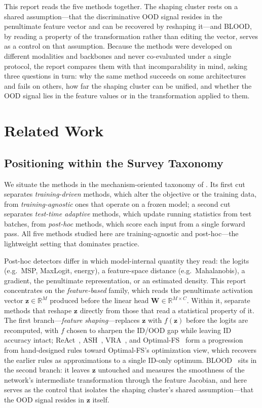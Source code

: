 \documentclass[a4paper]{article}
\begin{document}
This report reads the five methods together. The shaping cluster rests on a shared
assumption---that the discriminative OOD signal resides in the penultimate feature
vector and can be recovered by reshaping it---and BLOOD, by reading a property of the
transformation rather than editing the vector, serves as a control on that assumption.
Because the methods were developed on different modalities and backbones and never
co-evaluated under a single protocol, the report compares them with that
incomparability in mind, asking three questions in turn: why the same method succeeds
on some architectures and fails on others, how far the shaping cluster can be unified,
and whether the OOD signal lies in the feature values or in the transformation applied
to them.

\section{Related Work}
\label{related}


\subsection{Positioning within the Survey Taxonomy}
\label{subsec:taxonomy}

We situate the methods in the mechanism-oriented taxonomy of \citet{survey}. Its
first cut separates \emph{training-driven} methods, which alter the objective or the
training data, from \emph{training-agnostic} ones that operate on a frozen model; a
second cut separates \emph{test-time adaptive} methods, which update running
statistics from test batches, from \emph{post-hoc} methods, which score each input
from a single forward pass. All five methods studied here are training-agnostic and
post-hoc---the lightweight setting that dominates practice.

Post-hoc detectors differ in which model-internal quantity they read: the logits
(e.g.\ MSP, MaxLogit, energy), a feature-space distance (e.g.\ Mahalanobis), a
gradient, the penultimate representation, or an estimated density. This report
concentrates on the \emph{feature-based} family, which reads the penultimate
activation vector $\mathbf{z} \in \mathbb{R}^{M}$ produced before the linear head
$\mathbf{W} \in \mathbb{R}^{M \times C}$. Within it, \citet{survey} separate methods
that reshape $\mathbf{z}$ directly from those that read a statistical property of it.
The first branch---\emph{feature shaping}---replaces $\mathbf{z}$ with $f(\mathbf{z})$
before the logits are recomputed, with $f$ chosen to sharpen the ID/OOD gap while
leaving ID accuracy intact; ReAct~\cite{react}, ASH~\cite{ash}, VRA~\cite{vra}, and
Optimal-FS~\cite{opt} form a progression from hand-designed rules toward
Optimal-FS's optimization view, which recovers the earlier rules as approximations to
a single ID-only optimum. BLOOD~\cite{blood} sits in the second branch: it leaves
$\mathbf{z}$ untouched and measures the smoothness of the network's intermediate
transformation through the feature Jacobian, and here serves as the control that
isolates the shaping cluster's shared assumption---that the OOD signal resides in
$\mathbf{z}$ itself.
\end{document}
